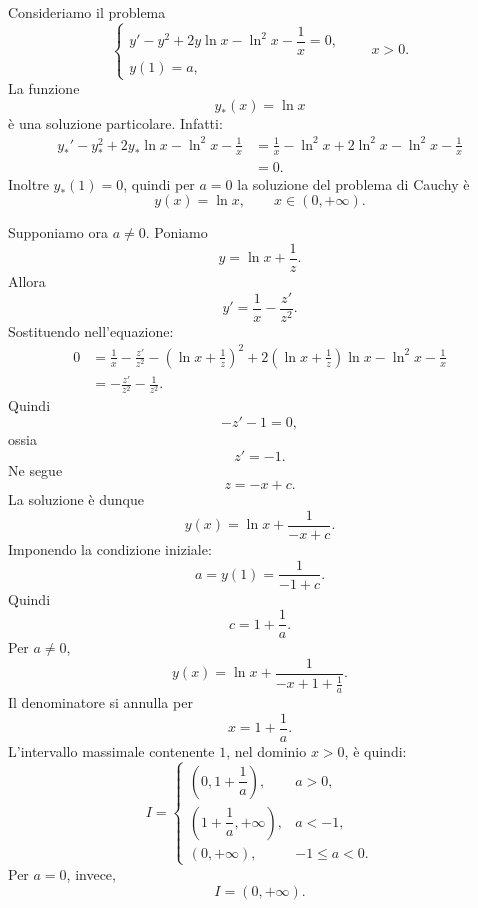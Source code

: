 \documentclass[a4paper]{article}
\begin{document}
\begin{radioactive}
\begin{snippetexample}{}
    Consideriamo il problema
    \[
        \begin{cases}
            y'-y^2+2y\ln x-\ln^2 x-\dfrac{1}{x}=0,\\
            y(1)=a,
        \end{cases}
        \qquad x>0.
    \]
    La funzione
    \[
        y_\ast(x)=\ln x
    \]
    è una soluzione particolare. Infatti:
    \begin{align*}
        y_\ast'-y_\ast^2+2y_\ast\ln x-\ln^2 x-\frac{1}{x}
        &=
        \frac{1}{x}
        -\ln^2 x
        +2\ln^2 x
        -\ln^2 x
        -\frac{1}{x}\\
        &=0.
    \end{align*}
    Inoltre \(y_\ast(1)=0\), quindi per \(a=0\) la soluzione del problema di Cauchy è
    \[
        y(x)=\ln x,
        \qquad x\in(0,+\infty).
    \]

    Supponiamo ora \(a\neq 0\). Poniamo
    \[
        y=\ln x+\frac{1}{z}.
    \]
    Allora
    \[
        y'=\frac{1}{x}-\frac{z'}{z^2}.
    \]
    Sostituendo nell'equazione:
    \begin{align*}
        0
        &=
        \frac{1}{x}-\frac{z'}{z^2}
        -
        \left(\ln x+\frac{1}{z}\right)^2
        +
        2\left(\ln x+\frac{1}{z}\right)\ln x
        -\ln^2 x
        -\frac{1}{x}\\
        &=
        -\frac{z'}{z^2}-\frac{1}{z^2}.
    \end{align*}
    Quindi
    \[
        -z'-1=0,
    \]
    ossia
    \[
        z'=-1.
    \]
    Ne segue
    \[
        z=-x+c.
    \]
    La soluzione è dunque
    \[
        y(x)=\ln x+\frac{1}{-x+c}.
    \]
    Imponendo la condizione iniziale:
    \[
        a=y(1)=\frac{1}{-1+c}.
    \]
    Quindi
    \[
        c=1+\frac{1}{a}.
    \]
    Per \(a\neq 0\),
    \[
        y(x)=\ln x+\frac{1}{-x+1+\frac{1}{a}}.
    \]
    Il denominatore si annulla per
    \[
        x=1+\frac{1}{a}.
    \]
    L'intervallo massimale contenente \(1\), nel dominio \(x>0\), è quindi:
    \[
        I=
        \begin{cases}
            \left(0,1+\dfrac{1}{a}\right), & a>0,\\[6pt]
            \left(1+\dfrac{1}{a},+\infty\right), & a<-1,\\[6pt]
            (0,+\infty), & -1\leq a<0.
        \end{cases}
    \]
    Per \(a=0\), invece,
    \[
        I=(0,+\infty).
    \]
\end{snippetexample}
\end{radioactive}
\end{document}
